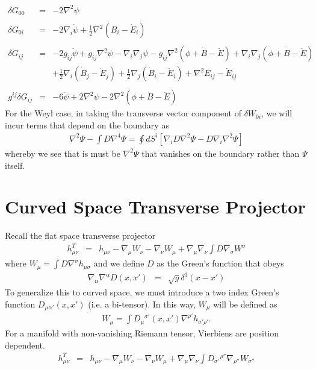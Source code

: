 \documentclass[10pt,letterpaper]{article}
\numberwithin{equation}{section}
\begin{document}
\begin{appendices}
\begin{eqnarray}
\delta G_{00} &=& -2 \nabla^2 \psi
\nonumber\\ \nonumber\\
\delta G_{0i} &=& -2\nabla_i \dot\psi + \tfrac12 \nabla^2 (B_i-\dot E_i)
\nonumber\\ \nonumber\\
\delta G_{ij} &=& -2g_{ij}\ddot \psi+g_{ij} \nabla^2\psi - \nabla_i\nabla_j \psi
-g_{ij}\nabla^2(\phi + \dot B - \ddot E) + \nabla_i\nabla_j (\phi +\dot B - \ddot E)
\nonumber\\
&& + \tfrac12 \nabla_i (\dot B_j - \ddot E_j) + \tfrac12\nabla_j (\dot B_i - \ddot E_i) +\nabla^2 E_{ij} - \ddot E_{ij}
\nonumber\\ \nonumber\\
g^{ij} \delta G_{ij} &=& -6\ddot \psi + 2\nabla^2 \psi - 2\nabla^2(\phi +\dot B-\ddot E)
\end{eqnarray}
For the Weyl case, in taking the transverse vector component of $\delta W_{0i}$, we will incur terms that depend on the boundary as
\begin{eqnarray}
\nabla^2\Psi - \int D \nabla^4 \Psi = \oint dS^i \left[\nabla_i D \nabla^2\Psi - D\nabla_i\nabla^2\Psi\right]
\end{eqnarray}
whereby we see that is must be $\nabla^2\Psi$ that vanishes on the boundary rather than $\Psi$ itself. 
\end{appendices}

\section{Curved Space Transverse Projector}

Recall the flat space transverse projector
%
\begin{eqnarray}
h^T_{\mu\nu} &=& h_{\mu\nu} - \nabla_\mu W_\nu - \nabla_\nu W_\mu + \nabla_\mu\nabla_\nu \int D \nabla_\sigma W^\sigma 
\end{eqnarray}
where $W_\mu = \int D \nabla^\sigma h_{\mu\sigma}$ and we define $D$ as the Green's function that obeys
\begin{eqnarray}
\nabla_\alpha\nabla^\alpha D(x,x') &=& \sqrt{g} \delta^3(x-x')
\end{eqnarray}
%
To generalize this to curved space, we must introduce a two index Green's function $D_{\mu\alpha'}(x,x')$ (i.e. a bi-tensor). In this way, $W_\mu$ will be defined as
\begin{eqnarray}
W_\mu = \int D_{\mu}{}^{\sigma'}(x,x') \nabla^{\rho'} h_{\sigma'\rho'}.
\end{eqnarray}
For a manifold with non-vanishing Riemann tensor, Vierbiens are position dependent. 
\begin{eqnarray}
h_{\mu\nu}^T &=& h_{\mu\nu} - \nabla_\mu W_\nu - \nabla_\nu W_\mu + \nabla_\mu\nabla_\nu \int D_{\sigma'}{}^{\rho''} \nabla_{\rho''}W_{\sigma''}
\end{eqnarray}
\end{document}
